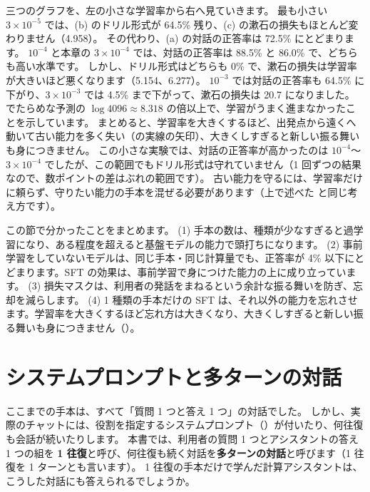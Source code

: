 三つのグラフを、左の小さな学習率から右へ見ていきます。
最も小さい $3\times10^{-5}$ では、(b) のドリル形式が 64.5\% 残り、(c) の漱石の損失もほとんど変わりません（4.958）。
その代わり、(a) の対話の正答率は 72.5\% にとどまります。
$10^{-4}$ と本章の $3\times10^{-4}$ では、対話の正答率は 88.5\% と 86.0\% で、どちらも高い水準です。
しかし、ドリル形式はどちらも 0\% で、漱石の損失は学習率が大きいほど悪くなります（5.154、6.277）。
$10^{-3}$ では対話の正答率も 64.5\% に下がり、$3\times10^{-3}$ では 4.5\% まで下がって、漱石の損失は 20.7 になりました。
でたらめな予測の $\log 4096 \approx 8.318$ の倍以上で、学習がうまく進まなかったことを示しています。
まとめると、学習率を大きくするほど、出発点から遠くへ動いて古い能力を多く失い（の実線の矢印）、大きくしすぎると新しい振る舞いも身につきません。
この小さな実験では、対話の正答率が高かったのは $10^{-4}$〜$3\times10^{-4}$ でしたが、この範囲でもドリル形式は守れていません（1 回ずつの結果なので、数ポイントの差はぶれの範囲です）。
古い能力を守るには、学習率だけに頼らず、守りたい能力の手本を混ぜる必要があります（上で述べた  と同じ考え方です）。

この節で分かったことをまとめます。
(1) 手本の数は、種類が少なすぎると過学習になり、ある程度を超えると基盤モデルの能力で頭打ちになります。
(2) 事前学習をしていないモデルは、同じ手本・同じ計算量でも、正答率が 4\% 以下にとどまります。SFT の効果は、事前学習で身につけた能力の上に成り立っています。
(3) 損失マスクは、利用者の発話をまねるという余計な振る舞いを防ぎ、忘却を減らします。
(4) 1 種類の手本だけの SFT は、それ以外の能力を忘れさせます。学習率を大きくするほど忘れ方は大きくなり、大きくしすぎると新しい振る舞いも身につきません（）。

\section{システムプロンプトと多ターンの対話}\label{sec:post-multiturn}

ここまでの手本は、すべて「質問 1 つと答え 1 つ」の対話でした。
しかし、実際のチャットには、役割を指定するシステムプロンプト（）が付いたり、何往復も会話が続いたりします。
本書では、利用者の質問 1 つとアシスタントの答え 1 つの組を \textbf{1 往復}と呼び、何往復も続く対話を\textbf{多ターンの対話}と呼びます（1 往復を 1 ターンとも言います）。
1 往復の手本だけで学んだ計算アシスタントは、こうした対話にも答えられるでしょうか。

